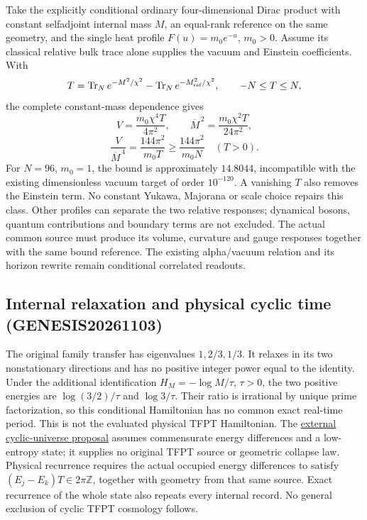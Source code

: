 Take the explicitly conditional ordinary four-dimensional Dirac
product with constant selfadjoint internal mass $M$, an equal-rank
reference on the same geometry, and the single heat profile
$F(u)=m_0e^{-u}$, $m_0>0$. Assume its classical relative bulk trace
alone supplies the vacuum and Einstein coefficients. With
\[
 T=\operatorname{Tr}_N e^{-M^2/\chi^2}
       -\operatorname{Tr}_N e^{-M_{\rm ref}^2/\chi^2},
 \qquad -N\leq T\leq N,
\]
the complete constant-mass dependence gives
\[
 V=\frac{m_0\chi^4T}{4\pi^2},\qquad
 \overline M^{\,2}=\frac{m_0\chi^2T}{24\pi^2},
\]
\[
 \frac{V}{\overline M^{\,4}}
       =\frac{144\pi^2}{m_0T}\geq\frac{144\pi^2}{m_0N}
       \quad(T>0).
\]
For $N=96$, $m_0=1$, the bound is approximately $14.8044$, incompatible
with the existing dimensionless vacuum target of order $10^{-120}$.
A vanishing $T$ also removes the Einstein term. No constant Yukawa,
Majorana or scale choice repairs this class. Other profiles can separate
the two relative responses; dynamical bosons, quantum contributions
and boundary terms are not excluded. The actual common source must
produce its volume, curvature and gauge responses together with the
same bound reference. The existing alpha/vacuum relation and its
horizon rewrite remain conditional correlated readouts.

\subsection*{Internal relaxation and physical cyclic time (GENESIS20261103)}

The original family transfer has eigenvalues $1,2/3,1/3$. It relaxes in
its two nonstationary directions and has no positive integer power
equal to the identity. Under the additional identification
$H_M=-\log M/\tau$, $\tau>0$, the two positive energies are
$\log(3/2)/\tau$ and $\log3/\tau$. Their ratio is irrational by unique
prime factorization, so this conditional Hamiltonian has no common
exact real-time period. This is not the evaluated physical TFPT
Hamiltonian. The \href{https://arxiv.org/abs/2605.30405}{external cyclic-universe proposal}
assumes
commensurate energy differences and a low-entropy state; it supplies
no original TFPT source or geometric collapse law. Physical recurrence
requires the actual occupied energy differences to satisfy
$(E_j-E_k)T\in2\pi\mathbb Z$, together with geometry from that same
source. Exact recurrence of the whole state also repeats every internal
record. No general exclusion of cyclic TFPT cosmology follows.

